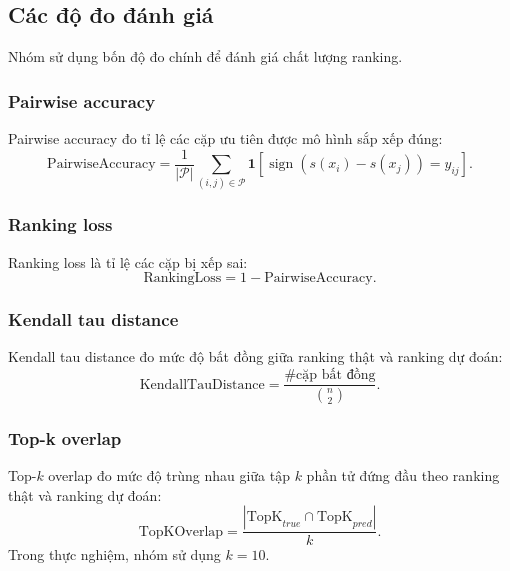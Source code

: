 \subsection{Các độ đo đánh giá}

Nhóm sử dụng bốn độ đo chính để đánh giá chất lượng ranking.

\subsubsection{Pairwise accuracy}

Pairwise accuracy đo tỉ lệ các cặp ưu tiên được mô hình sắp xếp đúng:
\begin{equation}
    \text{PairwiseAccuracy}
    =
    \frac{1}{|\mathcal{P}|}
    \sum_{(i,j)\in\mathcal{P}}
    \mathbf{1}
    \left[
        \operatorname{sign}(s(x_i)-s(x_j))=y_{ij}
    \right].
    \label{eq:experiment-pairwise-accuracy}
\end{equation}

\subsubsection{Ranking loss}

Ranking loss là tỉ lệ các cặp bị xếp sai:
\begin{equation}
    \text{RankingLoss}
    =
    1-\text{PairwiseAccuracy}.
    \label{eq:experiment-ranking-loss}
\end{equation}

\subsubsection{Kendall tau distance}

Kendall tau distance đo mức độ bất đồng giữa ranking thật và ranking dự đoán:
\begin{equation}
    \text{KendallTauDistance}
    =
    \frac{\#\text{cặp bất đồng}}{\binom{n}{2}}.
    \label{eq:experiment-kendall-tau-distance}
\end{equation}

\subsubsection{Top-k overlap}

Top-\(k\) overlap đo mức độ trùng nhau giữa tập \(k\) phần tử đứng đầu theo ranking thật và ranking dự đoán:
\begin{equation}
    \text{TopKOverlap}
    =
    \frac{
        |\text{TopK}_{true}\cap \text{TopK}_{pred}|
    }{k}.
    \label{eq:experiment-topk-overlap}
\end{equation}
Trong thực nghiệm, nhóm sử dụng \(k=10\).

